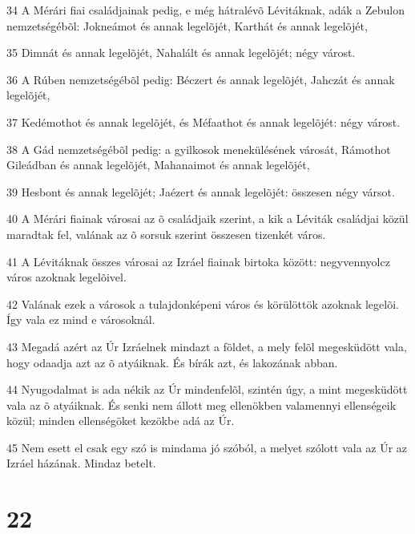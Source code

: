 \par 34 A Mérári fiai családjainak pedig, e még hátralévõ Lévitáknak, adák a Zebulon nemzetségébõl: Jokneámot és annak legelõjét, Karthát és annak legelõjét,
\par 35 Dimnát és annak legelõjét, Nahalált és annak legelõjét; négy várost.
\par 36 A Rúben nemzetségébõl pedig: Béczert és annak legelõjét, Jahczát és annak legelõjét,
\par 37 Kedémothot és annak legelõjét, és Méfaathot és annak legelõjét: négy várost.
\par 38 A Gád nemzetségébõl pedig: a gyilkosok menekülésének városát, Rámothot Gileádban és annak legelõjét, Mahanaimot és annak legelõjét,
\par 39 Hesbont és annak legelõjét; Jaézert és annak legelõjét: összesen négy vársot.
\par 40 A Mérári fiainak városai az õ családjaik szerint, a kik a Léviták családjai közül maradtak fel, valának az õ sorsuk szerint összesen tizenkét város.
\par 41 A Lévitáknak összes városai az Izráel fiainak birtoka között: negyvennyolcz város azoknak legelõivel.
\par 42 Valának ezek a városok a tulajdonképeni város és körülöttök azoknak legelõi. Így vala ez mind e városoknál.
\par 43 Megadá azért az Úr Izráelnek mindazt a földet, a mely felõl megesküdött vala, hogy odaadja azt az õ atyáiknak. És bírák azt, és lakozának abban.
\par 44 Nyugodalmat is ada nékik az Úr mindenfelõl, szintén úgy, a mint megesküdött vala az õ atyáiknak. És senki nem állott meg ellenökben valamennyi ellenségeik közül; minden ellenségöket kezökbe adá az Úr.
\par 45 Nem esett el csak egy szó is mindama jó szóból, a melyet szólott vala az Úr az Izráel házának. Mindaz  betelt.

\chapter{22}

